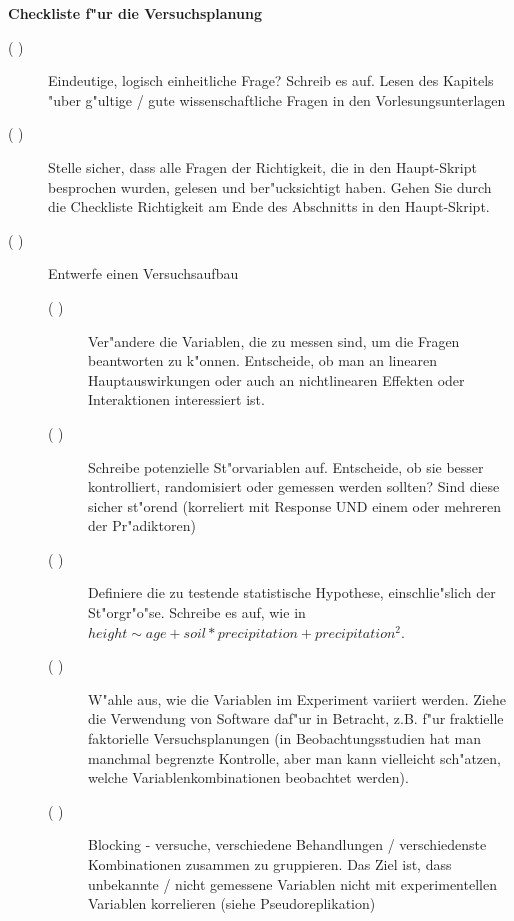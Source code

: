 \documentclass[a4paper,twoside]{tufte-book}\usepackage[]{graphicx}\usepackage[]{color}
\begin{document}
\newpage
\begin{mdframed}
    
\textbf{Checkliste f"ur die Versuchsplanung}

\begin{description}

\item[( )] Eindeutige, logisch einheitliche Frage? Schreib es auf. Lesen des Kapitels "uber g"ultige / gute wissenschaftliche Fragen in den Vorlesungsunterlagen

\item[( )] Stelle sicher, dass alle Fragen der Richtigkeit, die in den Haupt-Skript besprochen wurden, gelesen und ber"ucksichtigt haben. Gehen Sie durch die Checkliste Richtigkeit am Ende des Abschnitts in den Haupt-Skript.

\item[( )] Entwerfe einen Versuchsaufbau

  \begin{description}

  \item[( )] Ver"andere die Variablen, die zu messen sind, um die Fragen beantworten zu k"onnen. Entscheide, ob man an linearen Hauptauswirkungen oder auch an nichtlinearen Effekten oder Interaktionen interessiert ist.
  
  \item[( )] Schreibe potenzielle St"orvariablen auf. Entscheide, ob sie besser kontrolliert, randomisiert oder gemessen werden sollten? Sind diese sicher st"orend (korreliert mit Response UND einem oder mehreren der Pr"adiktoren)
  
  \item[( )] Definiere die zu testende statistische Hypothese, einschlie"slich der St"orgr"o"se. Schreibe es auf, wie in $height  \sim age + soil * precipitation + precipitation^2$. 
  
  \item[( )] W"ahle aus, wie die Variablen im Experiment variiert werden. Ziehe die Verwendung von Software daf"ur in Betracht, z.B. f"ur fraktielle faktorielle Versuchsplanungen (in Beobachtungsstudien hat man manchmal begrenzte Kontrolle, aber man kann vielleicht sch"atzen, welche Variablenkombinationen beobachtet werden).
  
  \item[( )] Blocking - versuche, verschiedene Behandlungen / verschiedenste Kombinationen zusammen zu gruppieren. Das Ziel ist, dass unbekannte / nicht gemessene Variablen nicht mit experimentellen Variablen korrelieren (siehe Pseudoreplikation)
  

\end{description}
\end{description}
\end{mdframed}
\end{document}
